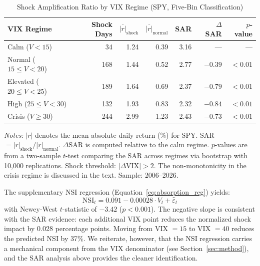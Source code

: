 \documentclass[12pt,a4paper]{article}
\begin{document}
\begin{table}[H]
\centering
\caption{Shock Amplification Ratio by VIX Regime (SPY, Five-Bin Classification)}
\label{tab:absorption_core}
\begin{threeparttable}
\begin{tabular}{lrrrrrr}
\toprule
VIX Regime & Shock Days & $\overline{|r|}_{\text{shock}}$ & $\overline{|r|}_{\text{normal}}$ & SAR & $\Delta$ SAR & $p$-value \\
\midrule
Calm ($V < 15$)              & 34  & 1.24 & 0.39 & 3.16 & ---     & ---       \\
Normal ($15 \leq V < 20$)    & 168 & 1.44 & 0.52 & 2.77 & $-0.39$ & $< 0.01$ \\
Elevated ($20 \leq V < 25$)  & 189 & 1.64 & 0.69 & 2.37 & $-0.79$ & $< 0.01$ \\
High ($25 \leq V < 30$)      & 132 & 1.93 & 0.83 & 2.32 & $-0.84$ & $< 0.01$ \\
Crisis ($V \geq 30$)         & 244 & 2.99 & 1.23 & 2.43 & $-0.73$ & $< 0.01$ \\
\bottomrule
\end{tabular}
\begin{tablenotes}
\small
\item \textit{Notes:} $\overline{|r|}$ denotes the mean absolute daily return (\%) for SPY. SAR $= \overline{|r|}_{\text{shock}} / \overline{|r|}_{\text{normal}}$. $\Delta$SAR is computed relative to the calm regime. $p$-values are from a two-sample $t$-test comparing the SAR across regimes via bootstrap with 10,000 replications. Shock threshold: $|\Delta\text{VIX}| > 2$. The non-monotonicity in the crisis regime is discussed in the text. Sample: 2006--2026.
\end{tablenotes}
\end{threeparttable}
\end{table}

The supplementary NSI regression (Equation~\ref{eq:absorption_reg}) yields:
\begin{equation}
\text{NSI}_t = 0.091 - 0.00028 \cdot V_t + \hat{\varepsilon}_t
\label{eq:absorption_result}
\end{equation}
with Newey-West $t$-statistic of $-3.42$ ($p < 0.001$). The negative slope is consistent with the SAR evidence: each additional VIX point reduces the normalized shock impact by 0.028 percentage points. Moving from VIX $= 15$ to VIX $= 40$ reduces the predicted NSI by 37\%. We reiterate, however, that the NSI regression carries a mechanical component from the VIX denominator (see Section~\ref{sec:method}), and the SAR analysis above provides the cleaner identification.
\end{document}
